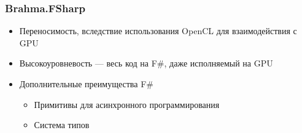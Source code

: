\documentclass[aspectratio=169]{beamer}
\begin{document}
\begin{frame}
  \frametitle{Brahma.FSharp}
    \begin{itemize}
        \item Переносимость, вследствие использования OpenCL для взаимодействия с GPU 
        \item Высокоуровневость --- весь код на F\#, даже исполняемый на GPU
        \item Дополнительные преимущества F\#
        \begin{itemize}
            \item Примитивы для асинхронного программирования
            \item Система типов
        \end{itemize}
    \end{itemize}
\end{frame}
\end{document}
